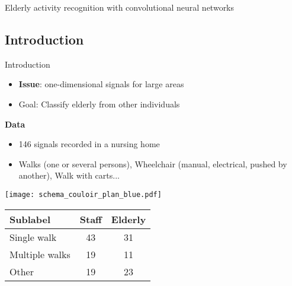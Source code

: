 \begingroup
{}  %
\begin{frame}[noframenumbering]{}
    \centering
    \vspace{3cm}
    \Huge
    \textcolor{myblue}{Elderly activity recognition with convolutional neural networks}
\end{frame}
\endgroup


\subsection{Introduction}

\begin{frame}{Introduction}{}
\centering
\begin{itemize}
    \centering
    \item \textbf{Issue}: one-dimensional signals for large areas
    \item Goal: Classify elderly from other individuals
\end{itemize}
\begin{minipage}[t]{0.40\linewidth}\vspace{0pt}
    \centering\textbf{Data}
    \begin{itemize}
        \item 146 signals recorded in a nursing home
        \item Walks (one or several persons), Wheelchair (manual, electrical, pushed by another), Walk with carts...
    \end{itemize}
    \texttt{[image: schema\_couloir\_plan\_blue.pdf]}
    \begin{table}[h]
        \small
        \centering 
        \begin{tabular}{lcc}
        \toprule
        \textbf{Sublabel} & \textbf{Staff} & \textbf{Elderly} \\
        \midrule
        Single walk & 43 & 31 \\
        Multiple walks & 19 & 11 \\
        Other & 19 & 23 \\
        \bottomrule
        \end{tabular}
    \end{table}
    \centering


\end{minipage}
\end{frame}
